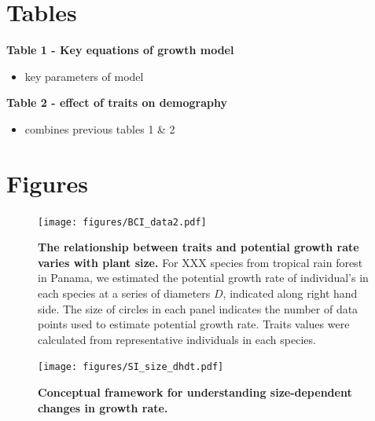 \documentclass[12pt, a4paper]{article}
\begin{document}
\section*{Tables}\label{tables}

\textbf{Table 1 - Key equations of growth model}

\begin{itemize}
\itemsep1pt\parskip0pt
\item
  key parameters of model
\end{itemize}

\textbf{Table 2 - effect of traits on demography}

\begin{itemize}
\itemsep1pt\parskip0pt
\item
  combines previous tables 1 \& 2
\end{itemize}


\newpage

\section*{Figures}\label{figures}

\begin{figure}[htbp]
\centering
\texttt{[image: figures/BCI\_data2.pdf]}
\caption{\textbf{The relationship between traits and potential growth
rate varies with plant size.} For XXX species from tropical rain forest
in Panama, we estimated the potential growth rate of individual's in
each species at a series of diameters \(D\), indicated along right hand
side. The size of circles in each panel indicates the number of data
points used to estimate potential growth rate. Traits values were
calculated from representative individuals in each species.
\label{f-BCI}}
\end{figure}

\newpage

\begin{figure}[htbp]
\centering
\texttt{[image: figures/SI\_size\_dhdt.pdf]}
\caption{\textbf{Conceptual framework for understanding size-dependent
changes in growth rate.} \label{f-conceptual}}
\end{figure}

\newpage
\end{document}
